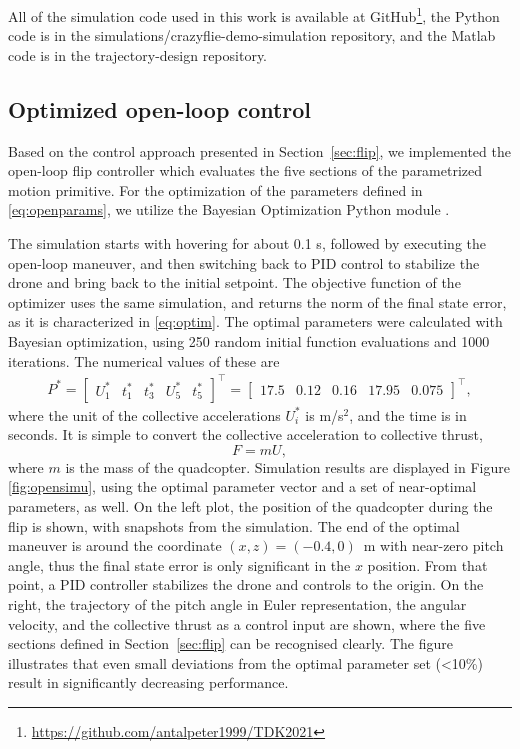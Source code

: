 All of the simulation code used in this work is available at GitHub\footnote{\url{https://github.com/antalpeter1999/TDK2021}}, the Python code is in the simulations/crazyflie-demo-simulation repository, and the Matlab code is in the trajectory-design repository.

\subsection{Optimized open-loop control}\label{sec:opensimu}
Based on the control approach presented in Section~\ref{sec:flip}, we implemented the open-loop flip controller which evaluates the five sections of the parametrized motion primitive. For the optimization of the parameters defined in \eqref{eq:openparams}, we utilize the Bayesian Optimization Python module \cite{bayesopt}.%

The simulation starts with hovering for about 0.1 s, followed by executing the open-loop maneuver, and then switching back to PID control to stabilize the drone and bring back to the initial setpoint. The objective function of the optimizer uses the same simulation, and returns the norm of the final state error, as it is characterized in \eqref{eq:optim}. The optimal parameters were calculated with Bayesian optimization, using 250 random initial function evaluations and 1000 iterations. The numerical values of these are
\begin{align}\label{eq:optparam}
P^*=\begin{bmatrix}
U_1^* & t_1^* & t_3^* & U_5^*& t_5^*
\end{bmatrix} ^\top =  \begin{bmatrix}
17.5 & 0.12 & 0.16 & 17.95 & 0.075
\end{bmatrix}^\top,
\end{align}
where the unit of the collective accelerations $U_i^*$ is m/s$^2$, and the time is in seconds. It is simple to convert the collective acceleration to collective thrust, 
\begin{equation}
    F = m U,
\end{equation}
where $m$ is the mass of the quadcopter. Simulation results are displayed in Figure \ref{fig:opensimu}, using the optimal parameter vector and a set of near-optimal parameters, as well. On the left plot, the position of the quadcopter during the flip is shown, with snapshots from the simulation. The end of the optimal maneuver is around the coordinate $(x, z)=(-0.4, 0)$~m with near-zero pitch angle, thus the final state error is only significant in the $x$ position. From that point, a PID controller stabilizes the drone and controls to the origin. On the right, the trajectory of the pitch angle in Euler representation, the angular velocity, and the collective thrust as a control input are shown, where the five sections defined in Section~\ref{sec:flip} can be recognised clearly. The figure illustrates that even small deviations from the optimal parameter set (<10\%) result in significantly decreasing performance.

